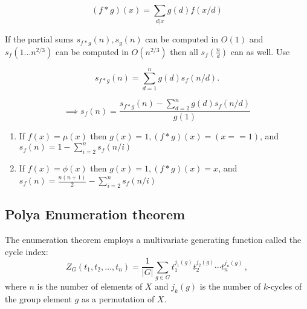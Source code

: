	$$(f*g)(x)=\sum_{d|x}g(d)f(x/d)$$

	If the partial sums $s_{f*g}(n),s_g(n)$ can be computed in $O(1)$ and $s_f(1\ldots n^{2/3})$  can be computed in $O\left(n^{2/3}\right)$ then all $s_f\left(\frac{n}{d}\right)$ can as well. Use

	$$s_{f*g}(n)=\sum_{d=1}^ng(d)s_f(n/d).$$ 

	 $$\implies s_f(n)=\frac{s_{f*g}(n)-\sum_{d=2}^ng(d)s_f(n/d)}{g(1)}$$
	\begin{enumerate}
	 \item If $f(x)=\mu(x)$ then $g(x)=1, (f*g)(x)=(x == 1)$, and $s_f(n)=1-\sum_{i=2}^ns_f(n/i)$\\

	 \item If $f(x)=\phi(x)$ then $g(x)=1, (f*g)(x)=x$, and $s_f(n)=\frac{n(n+1)}{2}-\sum_{i=2}^ns_f(n/i)$
  \end{enumerate}





	

\iffalse
\subsection{Polya Enumeration theorem}
The enumeration theorem employs a multivariate generating function called the cycle index:
$$Z_{G}(t_{1},t_{2},\ldots ,t_{n})={\frac {1}{|G|}}\sum _{g\in G}t_{1}^{j_{1}(g)}t_{2}^{j_{2}(g)}\cdots t_{n}^{j_{n}(g)}\,,$$
where $n$ is the number of elements of $X$ and $j_k(g)$ is the number of $k$-cycles of the group element $g$ as a permutation of $X$.

